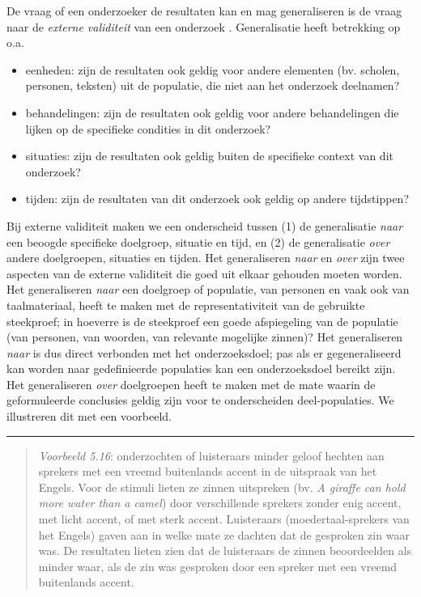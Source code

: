 \documentclass[
]{book}
\begin{document}
De vraag of een onderzoeker de resultaten kan en mag generaliseren is de
vraag naar de \emph{externe validiteit} van een onderzoek \citep{SCC02}.
Generalisatie heeft betrekking op o.a.

\begin{itemize}
\item
  eenheden: zijn de resultaten ook geldig voor andere elementen (bv.
  scholen, personen, teksten) uit de populatie, die niet aan het
  onderzoek deelnamen?
\item
  behandelingen: zijn de resultaten ook geldig voor andere
  behandelingen die lijken op de specifieke condities in dit
  onderzoek?
\item
  situaties: zijn de resultaten ook geldig buiten de specifieke
  context van dit onderzoek?
\item
  tijden: zijn de resultaten van dit onderzoek ook geldig op andere
  tijdstippen?
\end{itemize}

Bij externe validiteit maken we een onderscheid tussen (1) de
generalisatie \emph{naar} een beoogde specifieke doelgroep, situatie en tijd,
en (2) de generalisatie \emph{over} andere doelgroepen, situaties en tijden.
Het generaliseren \emph{naar} en \emph{over} zijn twee aspecten van de externe
validiteit die goed uit elkaar gehouden moeten worden. Het generaliseren
\emph{naar} een doelgroep of populatie, van personen en vaak ook van
taalmateriaal, heeft te maken met de representativiteit van de gebruikte
steekproef; in hoeverre is de steekproef een goede afspiegeling van de
populatie (van personen, van woorden, van relevante mogelijke zinnen)?
Het generaliseren \emph{naar} is dus direct verbonden met het onderzoeksdoel;
pas als er gegeneraliseerd kan worden naar gedefinieerde populaties kan
een onderzoeksdoel bereikt zijn. Het generaliseren \emph{over} doelgroepen
heeft te maken met de mate waarin de geformuleerde conclusies geldig
zijn voor te onderscheiden deel-populaties. We illustreren dit met een
voorbeeld.

\begin{center}\rule{0.5\linewidth}{0.5pt}\end{center}

\begin{quote}
\emph{Voorbeeld 5.16}: \citep{LevA10} onderzochten of luisteraars minder geloof hechten
aan sprekers met een
vreemd buitenlands accent in de uitspraak van het Engels. Voor de
stimuli lieten ze zinnen uitspreken (bv. \emph{A giraffe can hold more water
than a camel}) door verschillende sprekers zonder enig accent, met licht
accent, of met sterk accent. Luisteraars (moedertaal-sprekers van het
Engels) gaven aan in welke mate ze dachten dat de gesproken zin waar
was. De resultaten lieten zien dat de luisteraars de zinnen beoordeelden
als minder waar, als de zin was gesproken door een spreker met een
vreemd buitenlands accent.
\end{quote}
\end{document}
